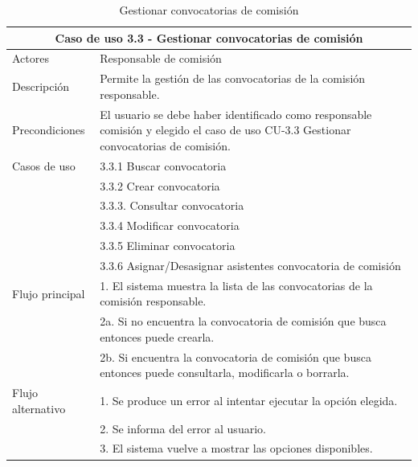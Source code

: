 \begin{table}[H]
    \caption{Gestionar convocatorias de comisión}
    \label{tab:CU-3.3}
    \begin{center}
        \begin{tabular}{|l|p{12cm}|}
            \hline
            \multicolumn{2}{|c|}{Caso de uso 3.3 - Gestionar convocatorias de comisión} \\
            \hline \hline
            Actores                 &   Responsable de comisión          \\  
            \hline
            Descripción             &   Permite la gestión de las convocatorias de la comisión responsable. \\  \hline
            Precondiciones          &   El usuario se debe haber identificado como responsable comisión y elegido el caso de uso CU-3.3 Gestionar convocatorias de comisión. \\  \hline
            Casos de uso            & 
            3.3.1 Buscar convocatoria \\ 
            &
            3.3.2 Crear convocatoria \\ 
            & 
            3.3.3. Consultar convocatoria\\ 
            & 
            3.3.4 Modificar convocatoria \\ 
            &  
            3.3.5 Eliminar convocatoria \\ 
            &
            3.3.6 Asignar/Desasignar asistentes convocatoria de comisión \\
            \hline
   
            Flujo principal         &   1. El sistema muestra la lista de las convocatorias de la comisión responsable.   \\ 
            & 2a. Si no encuentra la convocatoria de comisión que busca entonces puede crearla. \\ 
            & 2b. Si encuentra la convocatoria de comisión que busca entonces puede consultarla, modificarla o borrarla. \\ \hline
            Flujo alternativo    &   1. Se produce un error al intentar ejecutar la opción elegida.  \\ 
            & 2. Se informa del error al usuario. \\
            & 3. El sistema vuelve a mostrar las opciones disponibles. \\
            \hline
        \end{tabular}
    \end{center}
\end{table}

